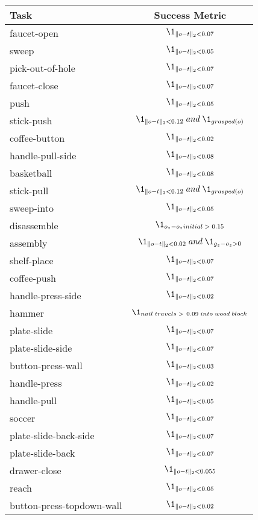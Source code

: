\begin{table}[h]
    \centering
    \begin{tabular}{lc}
\toprule
\footnotesize Task & Success Metric  \\
\midrule
faucet-open &  $\1_{\|o - t\|_2 < 0.07}$\\
sweep & $\1_{\|o - t\|_2 < 0.05}$\\
pick-out-of-hole & $\1_{\|o - t\|_2 < 0.07}$\\
faucet-close & $\1_{\|o - t\|_2 < 0.07}$\\
push & $\1_{\|o - t\|_2 < 0.05}$\\
stick-push & $\1_{\|o - t\|_2 < 0.12} \;and\; \1_{grasped(o)}$\\
coffee-button & $\1_{\|o - t\|_2 < 0.02}$\\
handle-pull-side & $\1_{\|o - t\|_2 < 0.08}$\\
basketball & $\1_{\|o - t\|_2 < 0.08}$\\
stick-pull & $\1_{\|o - t\|_2 < 0.12} \;and\; \1_{grasped(o)}$\\
sweep-into & $\1_{\|o - t\|_2 < 0.05}$\\
disassemble & $\1_{o_z - o_z initial \;>\; 0.15}$\\
assembly & $\1_{\|o - t\|_2 < 0.02} \;and\; \1_{g_z-o_z > 0}$\\
shelf-place & $\1_{\|o - t\|_2 < 0.07}$\\
coffee-push & $\1_{\|o - t\|_2 < 0.07}$\\
handle-press-side & $\1_{\|o - t\|_2 < 0.02}$\\
hammer & $\1_{nail \;travels\; >\ 0.09 \;into \;wood \;block}$\\
plate-slide & $\1_{\|o - t\|_2 < 0.07}$\\
plate-slide-side & $\1_{\|o - t\|_2 < 0.07}$\\
button-press-wall & $\1_{\|o - t\|_2 < 0.03}$\\
handle-press & $\1_{\|o - t\|_2 < 0.02}$\\
handle-pull & $\1_{\|o - t\|_2 < 0.05}$\\
soccer & $\1_{\|o - t\|_2 < 0.07}$\\
plate-slide-back-side & $\1_{\|o - t\|_2 < 0.07}$\\
plate-slide-back & $\1_{\|o - t\|_2 < 0.07}$\\
drawer-close & $\1_{\|o - t\|_2 < 0.055}$\\
reach & $\1_{\|o - t\|_2 < 0.05}$\\
button-press-topdown-wall & $\1_{\|o - t\|_2 < 0.02}$\\

\end{tabular}
\end{table}
